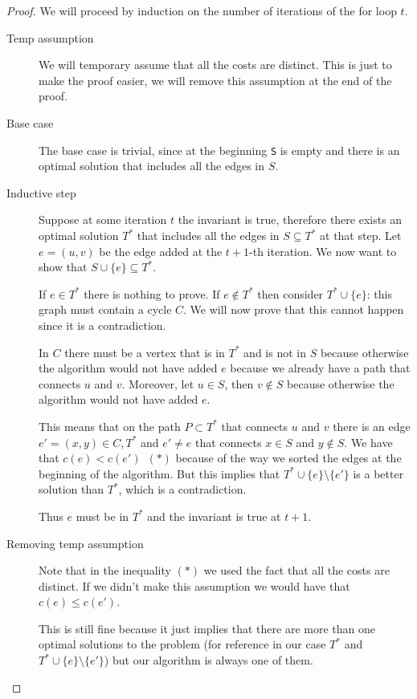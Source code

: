 \documentclass[12pt]{extarticle}
\begin{document}
\begin{proof}
    We will proceed by induction on the number of iterations of the for loop $t$.


    \begin{description}
        \item[Temp assumption]
            We will temporary assume that all the costs are distinct.
            This is just to make the proof easier, we will remove this assumption at the end of the proof.
        \item[Base case]
            The base case is trivial, since at the beginning \texttt{S} is empty and there is an optimal solution that includes all the edges in $S$.
        \item[Inductive step]
            Suppose at some iteration $t$ the invariant is true, therefore there exists an optimal solution $T^*$ that includes all the edges in $S \subseteq T^*$ at that step. Let $e = (u, v)$ be the edge added at the $t+1$-th iteration.
            We now want to show that $S \cup \{e\} \subseteq T^*$.

            If $e \in T^*$ there is nothing to prove.
            If $e \notin T^*$ then consider $T^* \cup \{e\}$: this graph must contain a cycle $C$.
            We will now prove that this cannot happen since it is a contradiction.

            In $C$ there must be a vertex that is in $T^*$ and is not in $S$ because otherwise the algorithm would not have added $e$ because we already have a path that connects $u$ and $v$.
            Moreover, let $u \in S$, then $v \notin S$ because otherwise the algorithm would not have added $e$.

            This means that on the path $P \subset T^*$ that connects $u$ and $v$ there is an edge $e' = (x,y) \in C, T^*$ and $e' \neq e$ that connects $x \in S$ and $y \notin S$.
            We have that $c(e) < c(e') \enspace (*)$ because of the way we sorted the edges at the beginning of the algorithm.
            But this implies that $T^* \cup \{e\} \setminus \{e'\}$ is a better solution than $T^*$, which is a contradiction.

            Thus $e$ must be in $T^*$ and the invariant is true at $t+1$.
        \item[Removing temp assumption]
            Note that in the inequality $(*)$ we used the fact that all the costs are distinct.
            If we didn't make this assumption we would have that $c(e) \leq c(e')$.

            This is still fine because it just implies that there are more than one optimal solutions to the problem (for reference in our case $T^*$ and $T^* \cup \{e\} \setminus \{e'\}$) but our algorithm is always one of them.
    \end{description}
\end{proof}
\end{document}
